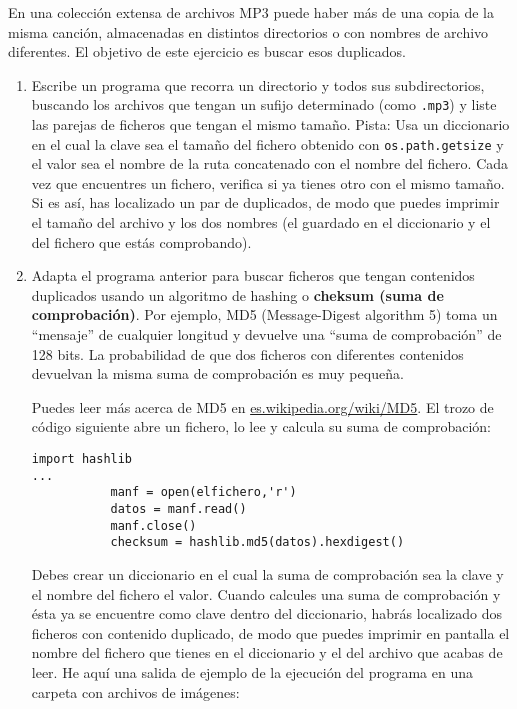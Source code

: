 \begin{ex}
\label{checksum}


En una colección extensa de archivos MP3 puede haber más de una
copia de la misma canción, almacenadas en distintos directorios o con
nombres de archivo diferentes. El objetivo de este ejercicio es buscar
esos duplicados.

\begin{enumerate}

\item Escribe un programa que recorra un directorio y todos sus
subdirectorios, buscando los archivos que tengan un sufijo determinado (como {\tt .mp3})
y liste las parejas de ficheros que tengan el mismo tamaño.
Pista: Usa un diccionario en el cual la clave sea el tamaño
del fichero obtenido con {\tt os.path.getsize} y el valor sea
el nombre de la ruta concatenado con el nombre del fichero.
Cada vez que encuentres un fichero, verifica si ya tienes otro
con el mismo tamaño. Si es así, has localizado un par de duplicados,
de modo que puedes imprimir el tamaño del archivo y los dos nombres
(el guardado en el diccionario y el del fichero que estás comprobando).


\item Adapta el programa anterior para buscar ficheros que
tengan contenidos duplicados usando un algoritmo de hashing o
{\bf cheksum (suma de comprobación)}. Por ejemplo,
MD5 (Message-Digest algorithm 5) toma un ``mensaje'' de cualquier
longitud y devuelve una ``suma de comprobación'' de 128 bits. La probabilidad
de que dos ficheros con diferentes contenidos devuelvan la misma
suma de comprobación es muy pequeña.

Puedes leer más acerca de MD5 en \url{es.wikipedia.org/wiki/MD5}. El trozo
de código siguiente abre un fichero, lo lee y calcula
su suma de comprobación:

\beforeverb
\begin{verbatim}
import hashlib 
...
           manf = open(elfichero,'r')
           datos = manf.read()
           manf.close()
           checksum = hashlib.md5(datos).hexdigest()
\end{verbatim}
\afterverb
%
Debes crear un diccionario en el cual la suma de comprobación sea la clave
y el nombre del fichero el valor. Cuando calcules una suma de comprobación
y ésta ya se encuentre como clave dentro del diccionario, habrás localizado
dos ficheros con contenido duplicado, de modo que puedes imprimir en pantalla el nombre del
fichero que tienes en el diccionario y el del archivo que acabas de leer. He aquí una salida
de ejemplo de la ejecución del programa en una carpeta con archivos de imágenes:


\end{enumerate}
\end{ex}
